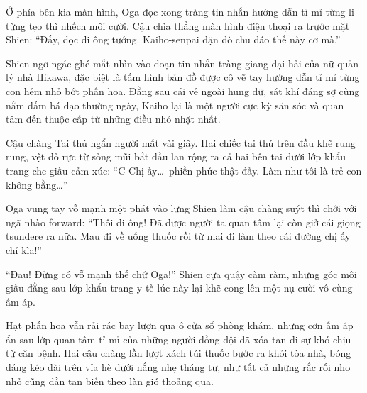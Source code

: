 \documentclass[../main.tex]{subfiles}
\begin{document}
Ở phía bên kia màn hình, Oga đọc xong tràng tin nhắn hướng dẫn tỉ mỉ từng li từng tẹo thì nhếch môi cười. Cậu chìa thẳng màn hình điện thoại ra trước mặt Shien: ``Đấy, đọc đi ông tướng. Kaiho-senpai dặn dò chu đáo thế này cơ mà.''

Shien ngơ ngác ghé mắt nhìn vào đoạn tin nhắn tràng giang đại hải của nữ quản lý nhà Hikawa, đặc biệt là tấm hình bản đồ được cô vẽ tay hướng dẫn tỉ mỉ từng con hẻm nhỏ bớt phấn hoa. Đằng sau cái vẻ ngoài hung dữ, sát khí đáng sợ cùng nắm đấm bá đạo thường ngày, Kaiho lại là một người cực kỳ săn sóc và quan tâm đến thuộc cấp từ những điều nhỏ nhặt nhất.

Cậu chàng Tai thú ngẩn người mất vài giây. Hai chiếc tai thú trên đầu khẽ rung rung, vệt đỏ rực từ sống mũi bắt đầu lan rộng ra cả hai bên tai dưới lớp khẩu trang che giấu cảm xúc: ``C-Chị ấy\dots\ phiền phức thật đấy. Làm như tôi là trẻ con không bằng\dots''

Oga vung tay vỗ mạnh một phát vào lưng Shien làm cậu chàng suýt thì chới với ngã nhào forward: ``Thôi đi ông! Đã được người ta quan tâm lại còn giở cái giọng tsundere ra nữa. Mau đi về uống thuốc rồi từ mai đi làm theo cái đường chị ấy chỉ kìa!''

``Đau! Đừng có vỗ mạnh thế chứ Oga!'' Shien cựa quậy càm ràm, nhưng góc môi giấu đằng sau lớp khẩu trang y tế lúc này lại khẽ cong lên một nụ cười vô cùng ấm áp.

Hạt phấn hoa vẫn rải rác bay lượn qua ô cửa sổ phòng khám, nhưng cơn ấm áp ẩn sau lớp quan tâm tỉ mỉ của những người đồng đội đã xóa tan đi sự khó chịu từ căn bệnh. Hai cậu chàng lần lượt xách túi thuốc bước ra khỏi tòa nhà, bóng dáng kéo dài trên vỉa hè dưới nắng nhẹ tháng tư, như tất cả những rắc rối nho nhỏ cũng dần tan biến theo làn gió thoảng qua.
\end{document}
